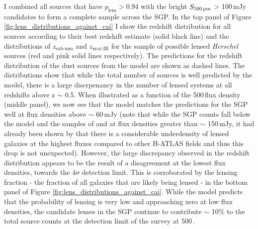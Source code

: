 I combined all sources that have $p_{\textrm{lens}} > 0.94$ with the bright $S_{\textrm{500\,\micron}}$ > 100\,mJy candidates to form a complete sample across the SGP. In the top panel of Figure \ref{fig:lens_distributions_against_cai} I show the redshift distribution for all sources according to their best redshift estimate (solid black line) and the distributions of $z_{\textrm{sub-mm}}$ and $z_{\textrm{near-IR}}$ for the sample of possible lensed \textit{Herschel} sources (red and pink solid lines respectively). The predictions for the redshift distribution of the dust sources from the \citealt{Cai_2013} model are shown as dashed lines. The distributions show that while the total number of sources is well predicted by the model, there is a large discrpenancy in the number of lensed systems at all redshifts above z $\sim$ 0.5. When illustrated as a function of the 500\,\micron flux density (middle panel), we now see that the \citealt{Cai_2013} model matches the predictions for the SGP well at flux densities above $\sim$ 60\,mJy (note that while the SGP counts fall below the model and the samples of \citealt{Negrello_2017} and \citealt{Nayyeri_2016} at flux densities greater than $\sim$ 150\,mJy, it had already been shown by \citealt{Negrello_2017} that there is a considerable underdensity of lensed galaxies at the highest fluxes compared to other H-ATLAS fields and thus this drop is not unexpected). However, the large discrepancy observed in the redshift distribution appears to be the result of a disagreement at the lowest flux densities, towards the 4$\sigma$ detection limit. This is corroborated by the lensing fraction - the fraction of all galaxies that are likely being lensed - in the bottom panel of Figure \ref{fig:lens_distributions_against_cai}. While the model predicts that the probability of lensing is very low and approaching zero at low flux densities, the candidate lenses in the SGP continue to contribute $\sim$ 10\% to the total source counts at the detection limit of the survey at 500\,\micron.

